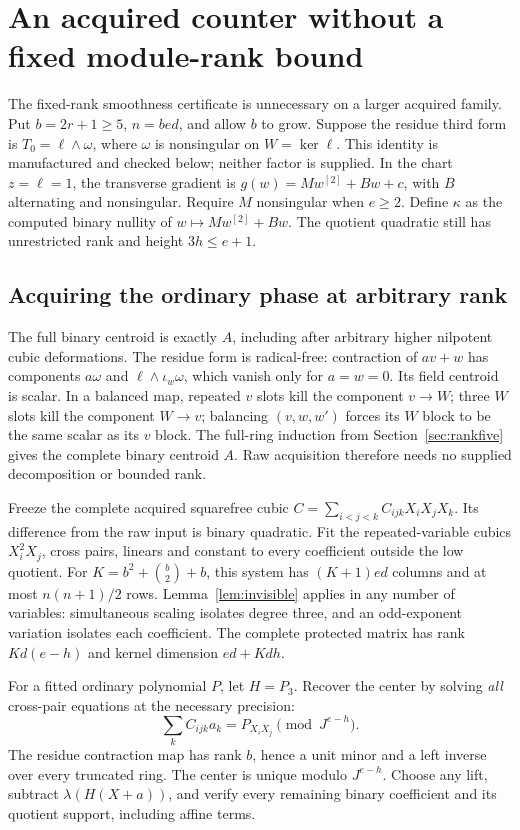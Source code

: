 \section{An acquired counter without a fixed module-rank bound}\label{sec:contact}
The fixed-rank smoothness certificate is unnecessary on a larger acquired
family. Put $b=2r+1\ge5$, $n=bed$, and allow $b$ to grow.
Suppose the residue third form is $T_0=\ell\wedge\omega$, where
$\omega$ is nonsingular on $W=\ker\ell$. This identity is manufactured
and checked below; neither factor is supplied. In the chart $z=\ell=1$,
the transverse gradient is $g(w)=Mw^{[2]}+Bw+c$, with $B$ alternating
and nonsingular. Require $M$ nonsingular when $e\ge2$.
Define $\kappa$ as the computed binary nullity of $w\mapsto Mw^{[2]}+Bw$.
The quotient quadratic still has unrestricted rank and height $3h\le e+1$.

\subsection{Acquiring the ordinary phase at arbitrary rank}
The full binary centroid is exactly $A$, including after arbitrary higher
nilpotent cubic deformations. The residue form is radical-free: contraction
of $av+w$ has components $a\omega$ and $\ell\wedge\iota_w\omega$,
which vanish only for $a=w=0$. Its field centroid is scalar. In a balanced
map, repeated $v$ slots kill the component $v\to W$; three $W$ slots kill
the component $W\to v$; balancing $(v,w,w')$ forces its $W$ block to be
the same scalar as its $v$ block. The full-ring induction from
Section~\ref{sec:rankfive} gives the complete binary centroid $A$.
Raw acquisition therefore needs no supplied decomposition or bounded rank.

Freeze the complete acquired squarefree cubic
$C=\sum_{i<j<k}C_{ijk}X_iX_jX_k$. Its difference from the raw input is
binary quadratic. Fit the repeated-variable cubics $X_i^2X_j$, cross
pairs, linears and constant to every coefficient outside the low quotient.
For $K=b^2+\binom b2+b$, this system has $(K+1)ed$ columns and at most
$n(n+1)/2$ rows. Lemma~\ref{lem:invisible} applies in any number of
variables: simultaneous scaling isolates degree three, and an
odd-exponent variation isolates each coefficient. The complete protected
matrix has rank $Kd(e-h)$ and kernel dimension $ed+Kdh$.

For a fitted ordinary polynomial $P$, let $H=P_3$. Recover the center by
solving \emph{all} cross-pair equations at the necessary precision:
\[
 \sum_kC_{ijk}a_k=P_{X_iX_j}\pmod{J^{e-h}}.
\]
The residue contraction map has rank $b$, hence a unit minor and a left
inverse over every truncated ring. The center is unique modulo $J^{e-h}$.
Choose any lift, subtract $\lambda(H(X+a))$, and verify every remaining
binary coefficient and its quotient support, including affine terms.

